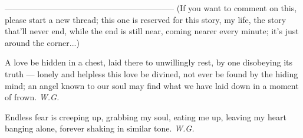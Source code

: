 --------------------------------------------------------------
(If you want to comment on this, please start a new thread; this one is reserved for this story, my life, the story that'll never end, while the end is still near, coming nearer every minute; it's just around the corner...)

A love be hidden in a chest, 
laid there to unwillingly rest, 
by one disobeying its truth --- 
lonely and helpless this love be divined, 
not ever be found by the hiding mind; 
an angel known to our soul may find 
what we have laid down 
in a moment of frown. 
\emph{W.G.}

Endless fear is creeping up, 
grabbing my soul, eating me up, 
leaving my heart banging alone, 
forever shaking in similar tone. 
\emph{W.G.}
